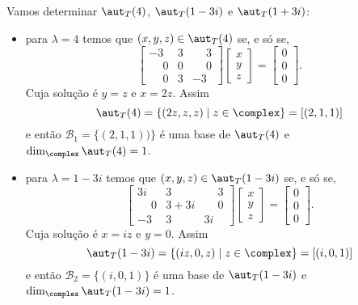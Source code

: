 \begin{exemplo}
\begin{enumerate}[label={\arabic*})]
\begin{solucao}
                Vamos determinar $\aut_T(4)$, $\aut_T(1 - 3i)$ e $\aut_T(1 + 3i)$:
                \begin{itemize}
                    \item para $\lambda = 4$ temos que $(x,y,z) \in \aut_T(4)$ se, e s\'o se,
                    \[
                        \begin{bmatrix}-3 & 3 & \phantom{-}3\\\phantom{-}0 & 0 & \phantom{-}0\\\phantom{-}0 & 3 & -3\end{bmatrix}
                        \begin{bmatrix}x\\y\\z\end{bmatrix} = \begin{bmatrix}0\\0\\0\end{bmatrix}.
                    \]
                    Cuja solução é $y = z$ e $x = 2z$. Assim
                    \[
                        \aut_T(4) = \{(2z,z,z) \mid z \in \complex\} = [(2,1,1)]
                    \]
                e então $\mathcal{B}_1 = \{(2,1,1))\}$ é uma base de $\aut_T(4)$ e $\dim_\complex\aut_T(4) = 1$.

                \item para $\lambda = 1 - 3i$ temos que $(x,y,z) \in \aut_T(1 - 3i)$ se, e s\'o se,
                \[
                    \begin{bmatrix}
                        3i & 3 & \phantom{-}3\\
                        \phantom{-}0 & 3 + 3i & \phantom{-}0\\
                        -3 & 3 & 3i
                    \end{bmatrix}\begin{bmatrix}
                        x\\y\\z
                    \end{bmatrix} = \begin{bmatrix}
                        0\\0\\0
                    \end{bmatrix}.
                \]
                Cuja solução é $x = iz$ e $y = 0$. Assim
                \[
                    \aut_T(1 - 3i) = \{(iz,0,z) \mid z \in \complex\} = [(i,0,1)]
                \]
                e então $\mathcal{B}_2 = \{(i,0,1)\}$ é uma base de $\aut_T(1 - 3i)$ e $\dim_\complex\aut_T(1 - 3i) = 1$.


\end{itemize}
\end{solucao}
\end{enumerate}
\end{exemplo}
